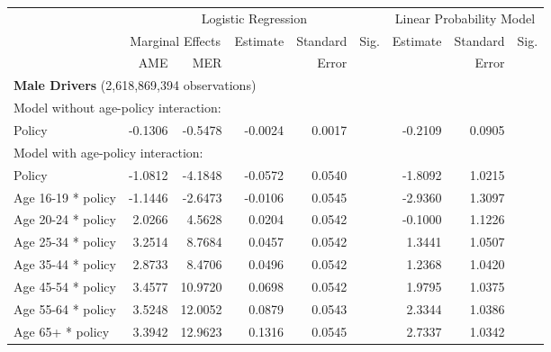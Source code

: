
\begin{table}%
\centering 
\begin{tabular}{l r r r r l r r l} 

\hline 
 
 & \multicolumn{5}{c}{Logistic Regression}  & \multicolumn{3}{c}{Linear Probability Model} \\ 

 \cmidrule(lr){2-6}\cmidrule(lr){7-9} 
 & \multicolumn{2}{c}{Marginal Effects} & Estimate & Standard & Sig. & Estimate & Standard & Sig. \\ 
 &   AME &  MER  &          &  Error   &      &          &  Error   &     \\ 

\hline 
 
\multicolumn{8}{l}{\textbf{Male Drivers} (2,618,869,394 observations)} \\ 

\hline
\multicolumn{8}{l}{Model without age-policy interaction: } \\ 
Policy                   &  -0.1306        &  -0.5478       &  -0.0024        &  0.0017       &            &  -0.2109        &  0.0905       &            \\ 
\hline
\multicolumn{8}{l}{Model with age-policy interaction: } \\ 
Policy                   &  -1.0812        &  -4.1848       &  -0.0572        &  0.0540       &            &  -1.8092        &  1.0215       &            \\ 
Age 16-19 * policy   &  -1.1446        &  -2.6473       &  -0.0106        &  0.0545       &            &  -2.9360        &  1.3097       &            \\ 
Age 20-24 * policy   &  2.0266        &  4.5628       &  0.0204        &  0.0542       &            &  -0.1000        &  1.1226       &            \\ 
Age 25-34 * policy   &  3.2514        &  8.7684       &  0.0457        &  0.0542       &            &  1.3441        &  1.0507       &            \\ 
Age 35-44 * policy   &  2.8733        &  8.4706       &  0.0496        &  0.0542       &            &  1.2368        &  1.0420       &            \\ 
Age 45-54 * policy   &  3.4577        &  10.9720       &  0.0698        &  0.0542       &            &  1.9795        &  1.0375       &            \\ 
Age 55-64 * policy   &  3.5248        &  12.0052       &  0.0879        &  0.0543       &            &  2.3344        &  1.0386       &            \\ 
Age 65+ * policy   &  3.3942        &  12.9623       &  0.1316        &  0.0545       &            &  2.7337        &  1.0342       &            \\ 


\end{tabular}
\end{table}
